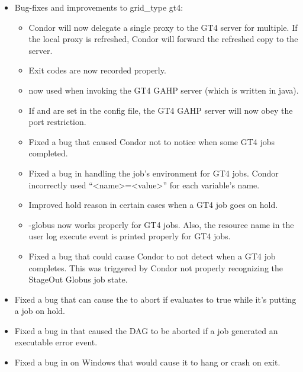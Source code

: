 \begin{itemize}
\item Bug-fixes and improvements to grid\_type gt4:

  \begin{itemize}

  \item Condor will now delegate a single proxy to the GT4 server for
  multiple. If the local proxy is refreshed, Condor will forward the
  refreshed copy to the server.

  \item Exit codes are now recorded properly.

  \item {} now used when invoking the GT4 GAHP
  server (which is written in java).

  \item If  and  are set in the config file,
  the GT4 GAHP server will now obey the port restriction.

  \item Fixed a bug that caused Condor not to notice when some GT4 jobs
  completed.

  \item Fixed a bug in handling the job's environment for GT4 jobs. Condor
  incorrectly used ``<name>=<value>'' for each variable's name.

  \item Improved hold reason in certain cases when a GT4 job goes on hold.

  \item {} -globus now works properly for GT4 jobs. Also, the resource
  name in the user log execute event is printed properly for GT4 jobs.

  \item Fixed a bug that could cause Condor to not detect when a GT4 job
  completes. This was triggered by Condor not properly recognizing the
  StageOut Globus job state.

  \end{itemize}

\item Fixed a bug that can cause the  to abort if
 evaluates to true while it's putting a job on hold.

\item Fixed a bug in  that
caused the DAG to be aborted if a job generated an executable error
event.

\item Fixed a bug in  on Windows that would cause it to
hang or crash on exit.


\end{itemize}
